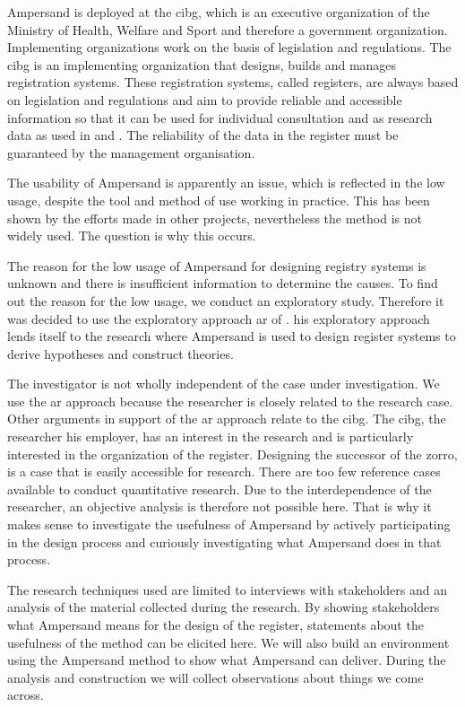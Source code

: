 Ampersand is deployed at the \acrshort{cibg}, which is an executive organization of the Ministry of Health, Welfare and Sport and therefore a government organization.
Implementing organizations work on the basis of legislation and regulations.
The \acrshort{cibg} is an implementing organization that designs, builds and manages registration systems.
These registration systems, called registers, are always based on legislation and regulations and aim to provide reliable and accessible information so that it can be used for individual consultation and as research data as used in \cite{schmidt_danish_2015} and \cite{bakken_norwegian_2019}.
The reliability of the data in the register must be guaranteed by the management organisation.

The usability of Ampersand is apparently an issue, which is reflected in the low usage, despite the tool and method of use working in practice.
This has been shown by the efforts made in other projects, nevertheless the method is not widely used.
The question is why this occurs.

The reason for the low usage of Ampersand for designing registry systems is unknown and there is insufficient information to determine the causes.
To find out the reason for the low usage, we conduct an exploratory study.
Therefore it was decided to use the exploratory approach \acrlong{ar} of \cite{Easterbrook}.
\cite{Easterbrook} his exploratory approach lends itself to the research where Ampersand is used to design register systems to derive hypotheses and construct theories.

The investigator is not wholly independent of the case under investigation.
We use the \acrshort{ar} approach because the researcher is closely related to the research case.
Other arguments in support of the \acrshort{ar} approach relate to the \acrshort{cibg}.
The \acrshort{cibg}, the researcher his employer, has an interest in the research and is particularly interested in the organization of the register.
Designing the successor of the \acrshort{zorro}, is a case that is easily accessible for research.
There are too few reference cases available to conduct quantitative research.
Due to the interdependence of the researcher, an objective analysis is therefore not possible here.
That is why it makes sense to investigate the usefulness of Ampersand by actively participating in the design process and curiously investigating what Ampersand does in that process.

The research techniques used are limited to interviews with stakeholders and an analysis of the material collected during the research.
By showing stakeholders what Ampersand means for the design of the register, statements about the usefulness of the method can be elicited here.
We will also build an environment using the Ampersand method to show what Ampersand can deliver.
During the analysis and construction we will collect observations about things we come across.

